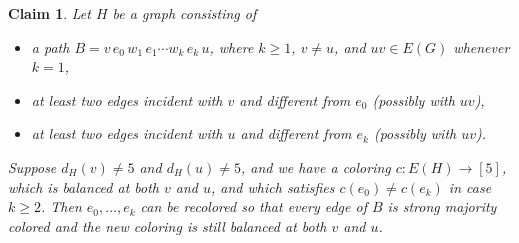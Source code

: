 \documentclass[10pt,a4paper]{amsart}
\newtheorem{claim}{Claim}
\begin{document}
\begin{claim}\label{claim:extend}
Let $H$ be a graph consisting of
\begin{itemize}
    \item a path $B=v\,e_0\,w_1\,e_1\cdots w_k\,e_k\,u$, where $k\ge 1$, $v\neq u$, and $uv\in E(G)$ whenever $k=1$,
    \item at least two edges incident with $v$ and different from $e_0$ (possibly with $uv$),
    \item at least two edges incident with $u$ and different from $e_k$ (possibly with $uv$).
\end{itemize} 
Suppose $d_H(v)\neq 5$ and $d_H(u)\neq 5$, and we have a coloring $c: E(H)\to [5]$, which is balanced at both $v$ and $u$, and which satisfies $c(e_0)\neq c(e_k)$ in case $k\geq 2$. Then $e_0,\dots,e_k$ can be recolored so that every edge of $B$ is strong majority colored and the new coloring is still balanced at both $v$ and $u$.
\end{claim}
\end{document}
